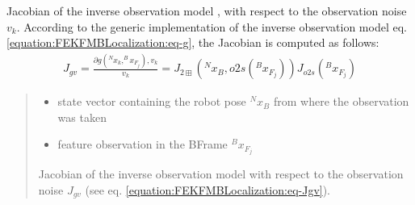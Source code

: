 \documentclass[letterpaper,10pt,english]{sphinxmanual}
\begin{document}
\begin{fulllineitems}
\begin{fulllineitems}
\begin{quote}
\begin{description}
\end{description}\end{quote}

\end{fulllineitems}


\begin{fulllineitems}
\label{\detokenize{FEKFMBLocalization:MapFeature.MapFeature.Jgv}}
\pysigstartsignatures
{}
\pysigstopsignatures
\sphinxAtStartPar
Jacobian of the inverse observation model {\hyperref[\detokenize{FEKFMBLocalization:MapFeature.MapFeature.g}]{}}, with respect to the observation noise \(v_k\).
According to the generic implementation of the inverse observation model {\hyperref[\detokenize{FEKFMBLocalization:MapFeature.MapFeature.g}]{}} eq. \eqref{equation:FEKFMBLocalization:eq-g}, the Jacobian is computed as follows:
\begin{equation}\label{equation:FEKFMBLocalization:eq-Jgv}
\begin{split}J_{gv}=\frac{\partial g(^Nx_k,^Bx_{F_j}),v_k}{v_k}=J_{2\boxplus}(^Nx_B,o2s(^Bx_{F_j})) J_{o2s}(^Bx_{F_j})\end{split}
\end{equation}\begin{quote}\begin{description}
\begin{itemize}
\item {} 
\sphinxAtStartPar
{} \textendash{} state vector containing the robot pose \(^Nx_B\) from where the observation was taken

\item {} 
\sphinxAtStartPar
{} \textendash{} feature observation in the B\sphinxhyphen{}Frame \(^Bx_{F_j}\)

\end{itemize}

\sphinxAtStartPar
Jacobian of the inverse observation model {\hyperref[\detokenize{FEKFMBLocalization:MapFeature.MapFeature.g}]{}} with respect to the observation noise \(J_{gv}\) (see eq. \eqref{equation:FEKFMBLocalization:eq-Jgv}).


\end{description}
\end{quote}
\end{fulllineitems}
\end{fulllineitems}
\end{document}
